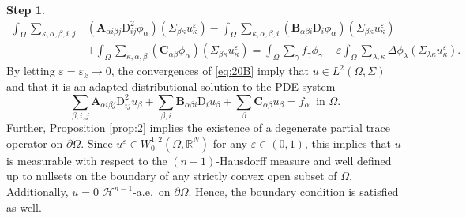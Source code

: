 \documentclass{amsart}
\numberwithin{equation}{section}
\numberwithin{thm}{section}
\theoremstyle{definition}
\newtheorem{proofpart}{Step}
\def\R{\mathbb{R}}
\def\Om{\Omega}
\def\p{\mathrm{p}}
\newcommand{\mH}{\mathcal{H}}
\renewcommand{\:}{\!:\!} %
\newcommand{\e}{\varepsilon}
\renewcommand{\p}{\partial}
\renewcommand{\^}[1]{^{#1}_{\phantom{l}}}
\begin{document}
\begin{proofpart}
\[\begin{split}
\int_{\Omega} \sum_{\kappa, \alpha, \beta, i, j} & (\mathbf{A}_{\alpha i \beta j} \mathrm{D}^2_{ij}\phi_{\alpha})(\Sigma_{\beta \kappa}u^{\varepsilon}_{\kappa}) - \int_{\Omega} \sum_{\kappa, \alpha, \beta, i} (\mathbf{B}_{\alpha \beta i} \mathrm{D}_{i}\phi_{\alpha})(\Sigma_{\beta \kappa}u^{\varepsilon}_{\kappa}) 
\\
&+  \int_{\Omega} \sum_{\kappa, \alpha, \beta} (\mathbf{C}_{\alpha \beta}\phi_{\alpha})(\Sigma_{\beta \kappa}u^{\varepsilon}_{\kappa}) = \int_{\Omega} \sum_{\gamma} f_{\gamma} \phi_{\gamma} - \varepsilon \int_{\Omega} \sum_{\lambda, \kappa} \Delta \phi_{\lambda}(\Sigma_{\lambda \kappa} u^{\varepsilon}_{\kappa}).
\end{split}
\]
By letting $\varepsilon = \varepsilon_k \rightarrow 0$, the convergences of \eqref{eq:20B} imply that $u \in L^2(\Omega, \Sigma)$ and that it is an adapted distributional solution to the PDE system
\begin{equation*} 
\sum_{\beta, i, j} \mathbf{A}_{\alpha i \beta j}\mathrm{D}_{ij}^{2}u_{\beta} + \sum_{\beta, i} \mathbf{B}_{\alpha \beta i}\mathrm{D}_{i}u_{\beta} + \sum_{\beta} \mathbf{C}_{\alpha \beta}u_{\beta} = f_{\alpha} \ \text{ in }\Om. 
\end{equation*}
Further, Proposition \ref{prop:2} implies the existence of a degenerate partial trace operator on $\p\Om$. Since $u^\e \in W^{1,2}_0(\Om,\R^N)$ for any $\e \in(0,1)$, this implies that $u$ is measurable with respect to the $(n-1)$-Hausdorff measure and well defined up to nullsets on the boundary of any strictly convex open subset of $\Om$. Additionally, $u=0$ $\mH^{n-1}$-a.e.\ on $\p\Om$. Hence, the boundary condition is satisfied as well.
\end{proofpart}
\end{document}
